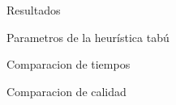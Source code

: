\documentclass[12pt,titlepage]{article}
\begin{document}
	

	\newpage

	

	\newpage

	
	
	\newpage
	
	
	
	\newpage
	
	\begin{section}{Resultados}
		\begin{subsection}{Parametros de la heurística tabú}
		\end{subsection}		

		\begin{subsection}{Comparacion de tiempos}
		\end{subsection}

		\begin{subsection}{Comparacion de calidad}
		\end{subsection}
	\end{section}
\end{document}
